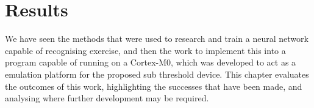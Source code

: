 \chapter{Results}\label{chap:results}

We have seen the methods that were used to research and train a neural network capable of recognising exercise, and then the work to implement this into a program capable of running on a Cortex-M0, which was developed to act as a emulation platform for the proposed sub threshold device. This chapter evaluates the outcomes of this work, highlighting the successes that have been made, and analysing where further development may be required.




